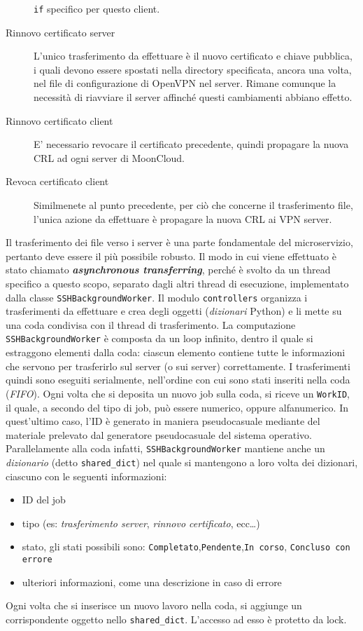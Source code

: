 \begin{description}
	\texttt{if} specifico per questo client.
	\item[Rinnovo certificato server]L'unico trasferimento da effettuare è il nuovo
	certificato e chiave pubblica, i quali devono essere spostati nella directory
	specificata, ancora una volta, nel file di configurazione di OpenVPN nel server.
	Rimane comunque la necessità di riavviare il server affinché questi cambiamenti abbiano
	effetto.
	\item[Rinnovo certificato client]E' necessario revocare il certificato precedente,
	quindi propagare la nuova CRL ad ogni server di MoonCloud.
	\item[Revoca certificato client]Similmenete al punto precedente, per ciò che concerne
	il trasferimento file, l'unica azione da effettuare è propagare la nuova
	CRL ai VPN server.
\end{description}

Il trasferimento dei file verso i server è una parte fondamentale del microservizio,
pertanto deve essere il più possibile robusto.
Il modo in cui viene effettuato è stato chiamato \textbf{\textit{asynchronous transferring}},
perché è svolto da un thread specifico a questo scopo, separato dagli altri thread di
esecuzione, implementato dalla classe \texttt{SSHBackgroundWorker}.
Il modulo \texttt{controllers} organizza i trasferimenti da effettuare e crea degli
oggetti (\textit{dizionari} Python) e li mette su una coda condivisa con il thread di
trasferimento.
La computazione \texttt{SSHBackgroundWorker} è composta da un loop infinito, dentro
il quale si estraggono elementi dalla coda: ciascun elemento contiene tutte le informazioni
che servono per trasferirlo sul server (o sui server) correttamente. I trasferimenti
quindi sono eseguiti serialmente, nell'ordine con cui sono stati inseriti
nella coda (\textit{FIFO}).
Ogni volta che si deposita un nuovo job sulla coda, si riceve un \texttt{WorkID}, il quale,
a secondo del tipo di job, può essere numerico, oppure alfanumerico. In quest'ultimo
caso, l'ID è generato in maniera pseudocasuale mediante del materiale
prelevato dal generatore pseudocasuale del sistema operativo.
Parallelamente alla coda infatti, \texttt{SSHBackgroundWorker} mantiene anche un \textit{dizionario}
(detto \texttt{shared\_dict})
nel quale si mantengono a loro volta dei dizionari, ciascuno con le seguenti informazioni:
\begin{itemize}
	\item ID del job
	\item tipo (es: \textit{trasferimento server}, \textit{rinnovo certificato}, ecc\ldots)
	\item stato, gli stati possibili sono: \texttt{Completato},\texttt{Pendente},\texttt{In corso},
	      \texttt{Concluso con errore}
	\item ulteriori informazioni, come una descrizione in caso di errore
\end{itemize}
Ogni volta che si inserisce un nuovo lavoro nella coda, si aggiunge un corrispondente oggetto
nello \texttt{shared\_dict}. L'accesso ad esso è protetto da lock.

